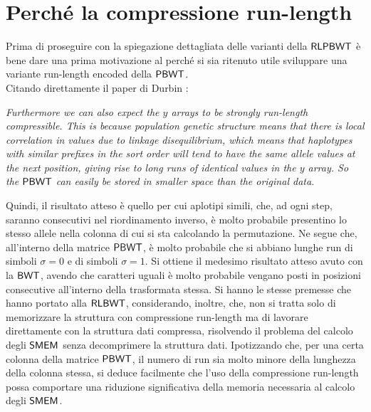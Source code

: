 \section{Perché la compressione run-length}
Prima di proseguire con la spiegazione dettagliata delle varianti della
$\mbox{\rm {\sf RLPBWT}}$ è bene dare 
una prima motivazione al perché si sia ritenuto utile sviluppare una variante
run-length encoded della $\mbox{\rm {\sf PBWT}}$.\\
Citando direttamente il paper di Durbin \cite{pbwt}:
\begin{center}
  \textit{Furthermore we can also expect the $y$ arrays to be strongly
    run-length compressible. This is because population genetic structure means
    that there 
    is local correlation in values due to linkage disequilibrium, which means
    that haplotypes with similar prefixes in the sort order will tend to have
    the same allele values at the next position, giving rise to long runs of
    identical values in the $y$ array. So the $\mbox{\rm {\sf PBWT}}$ can easily be stored in
    smaller space than the original data.} 
\end{center}
Quindi, il risultato atteso è quello per cui aplotipi simili, che, ad ogni step,
saranno consecutivi nel riordinamento inverso, è molto probabile presentino lo
stesso 
allele nella colonna di cui si sta calcolando la
permutazione. Ne segue che, all'interno della matrice $\mbox{\rm {\sf PBWT}}$, è molto
probabile che si abbiano lunghe run di simboli $\sigma=0$ e di simboli
$\sigma=1$.
Si ottiene il medesimo risultato atteso avuto con
la $\mbox{\rm {\sf BWT}}$, avendo che caratteri uguali è molto probabile vengano posti in
posizioni consecutive all'interno della trasformata stessa. Si hanno le
stesse premesse che hanno portato alla $\mbox{\rm {\sf RLBWT}}$, considerando, inoltre,
che, non si tratta solo di memorizzare la struttura con
compressione run-length ma di lavorare direttamente con la struttura dati
compressa, risolvendo il problema del calcolo degli $\mbox{\rm {\sf SMEM}}$ senza
decomprimere la struttura dati. Ipotizzando che, per una certa colonna della
matrice $\mbox{\rm {\sf PBWT}}$, il numero di run sia molto minore della lunghezza della
colonna stessa, si deduce facilmente che l'uso della compressione run-length
possa comportare una riduzione significativa della memoria necessaria al calcolo
degli $\mbox{\rm {\sf SMEM}}$.
